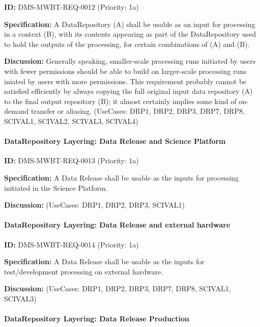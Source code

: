\documentclass[SE,toc,lsstdraft]{lsstdoc}
\begin{document}
\label{DMS-MWBT-REQ-0012}
\textbf{ID:} DMS-MWBT-REQ-0012 (Priority: 1a)

\textbf{Specification:}
A DataRepository (A) shall be usable as an input for processing in a context (B), with its contents appearing as part of the DataRepository used to hold the outputs of the processing, for certain combinations of (A) and (B).

\textbf{Discussion:}
Generally speaking, smaller-scale processing runs initiated by users with fewer permissions should be able to build on larger-scale processing runs iniated by users with more permissions. This requirement probably cannot be satisfied efficiently by always copying the full original input data repository (A) to the final output repository (B); it almost certainly implies some kind of on-demand transfer or aliasing. (UseCases: DRP1, DRP2, DRP3, DRP7, DRP8, SCIVAL1, SCIVAL2, SCIVAL3, SCIVAL4)

\paragraph{DataRepository Layering: Data Release and Science Platform}\hfill  %

\label{DMS-MWBT-REQ-0013}
\textbf{ID:} DMS-MWBT-REQ-0013 (Priority: 1a)

\textbf{Specification:}
A Data Release shall be usable as the inputs for processing initiated in the Science Platform.

\textbf{Discussion:}
(UseCases: DRP1, DRP2, DRP3, SCIVAL1)

\paragraph{DataRepository Layering: Data Release and external hardware}\hfill  %

\label{DMS-MWBT-REQ-0014}
\textbf{ID:} DMS-MWBT-REQ-0014 (Priority: 1a)

\textbf{Specification:}
A Data Release shall be usable as the inputs for test/development processing on external hardware.

\textbf{Discussion:}
(UseCases: DRP1, DRP2, DRP3, DRP7, DRP8, SCIVAL1, SCIVAL3)

\paragraph{DataRepository Layering: Data Release Production}\hfill  %
\end{document}
